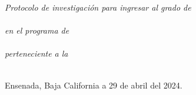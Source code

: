\documentclass[
12pt, %
singlespacing, %
headsepline, %
]{MastersDoctoralThesis} %
\begin{document}
\begin{titlepage}
\begin{center}

\large \textit{Protocolo de investigación para ingresar al grado de\\\degreename}\\[0.5cm] %
\textit{en el programa de}\\\deptname\\[0.5cm]
\textit{perteneciente a la}\\\facname\\[0.5cm] %

\vfill

\begin{flushright}
{\small Ensenada, Baja California a 29 de abril del 2024.}\\[2cm] %
\end{flushright}

\end{center}
\end{titlepage}



\end{document}
